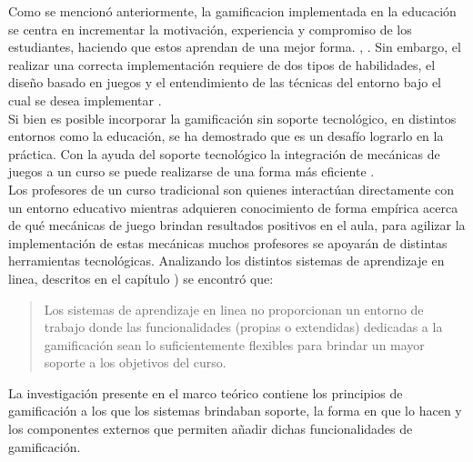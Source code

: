  Como se mencionó anteriormente, la \gls{gamificacion} implementada en la educación 
 se centra en incrementar la motivación, experiencia y compromiso de los estudiantes,
 haciendo que estos aprendan de una mejor forma. \cite{GamInE-Learning}, \cite{Lee}.
 \noindent Sin embargo, el realizar una correcta implementación requiere de dos tipos
 de habilidades, el diseño basado en juegos y el entendimiento de las técnicas del 
 entorno bajo el cual se desea implementar \cite[p. 7]{ForTheWin}.\\

 \noindent Si bien es posible incorporar la gamificación sin soporte tecnológico,
 en distintos entornos como la educación, se ha demostrado que es un desafío lograrlo 
 en la práctica. Con la ayuda del soporte tecnológico la integración de mecánicas de
 juegos a un curso se puede realizarse de una forma más eficiente
 \cite{Wood-Reiners}.\\

 \noindent Los profesores de un curso tradicional son quienes interactúan
 directamente con un entorno educativo mientras adquieren conocimiento de forma 
 empírica acerca de qué mecánicas de juego brindan resultados positivos en el aula, 
 para agilizar la implementación de estas mecánicas muchos profesores se apoyarán de 
 distintas herramientas tecnológicas. Analizando los distintos sistemas de 
 aprendizaje en linea, descritos en el capítulo ) se 
 encontró que:

    \begin{quote}
    \colorbox{blue!05}{\parbox{\dimexpr\linewidth-2\fboxsep}{\strut%
        Los sistemas de aprendizaje en linea no proporcionan un entorno
        de trabajo donde las funcionalidades (propias o extendidas) dedicadas
        a la gamificación sean lo suficientemente flexibles para brindar un
        mayor soporte a los objetivos del curso.
    \strut}}%
    \end{quote}

 \hfill \par
 \noindent La investigación presente en el marco teórico contiene los principios de 
 gamificación a los que los sistemas brindaban soporte, la forma en que lo hacen y 
 los componentes externos que permiten añadir dichas funcionalidades de gamificación.



